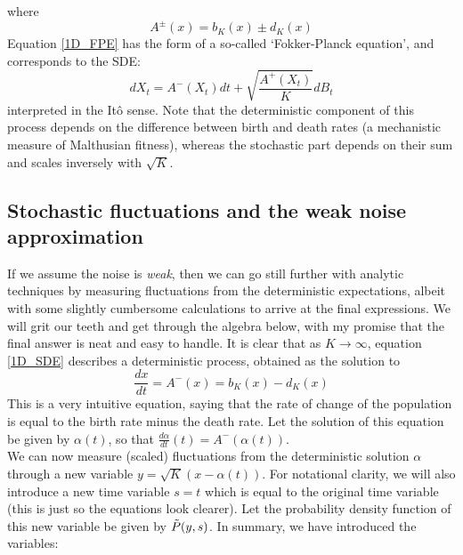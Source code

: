 where
\begin{equation*}
A^{\pm}(x) = b_K(x) \pm d_K(x)
\end{equation*}
Equation \eqref{1D_FPE} has the form of a so-called `Fokker-Planck equation', and corresponds to the SDE:
\begin{equation}
\label{1D_SDE}
dX_t = A^{-}(X_t)dt + \sqrt{\frac{A^{+}(X_t)}{K}}dB_t
\end{equation}
interpreted in the It\^{o} sense. Note that the deterministic component of this process depends on the difference between birth and death rates (a mechanistic measure of Malthusian fitness), whereas the stochastic part depends on their sum and scales inversely with $\sqrt{K}$.

\subsection{Stochastic fluctuations and the weak noise approximation}\label{sec_1D_WNA}
If we assume the noise is \emph{weak}, then we can go still further with analytic techniques by measuring fluctuations from the deterministic expectations, albeit with some slightly cumbersome calculations to arrive at the final expressions. We will grit our teeth and get through the algebra below, with my promise that the final answer is neat and easy to handle. It is clear that as $K \to \infty$, equation \eqref{1D_SDE} describes a deterministic process, obtained as the solution to
\begin{equation}
\label{1D_det_limit}
    \frac{dx}{dt} = A^{-}(x) = b_{K}(x) - d_{K}(x)
\end{equation}
This is a very intuitive equation, saying that the rate of change of the population is equal to the birth rate minus the death rate. Let the solution of this equation  be given by $\alpha(t)$, so that $\frac{d{\alpha}}{dt}(t) = A^{-}(\alpha(t))$.\\
We can now measure (scaled) fluctuations from the deterministic solution $\alpha$ through a new variable $y=\sqrt{K}\left(x-\alpha(t)\right)$. For notational clarity, we will also introduce a new time variable $s=t$ which is equal to the original time variable (this is just so the equations look clearer). Let the probability density function of this new variable be given by $\Tilde{P}(y,s)$. In summary, we have introduced the variables:
